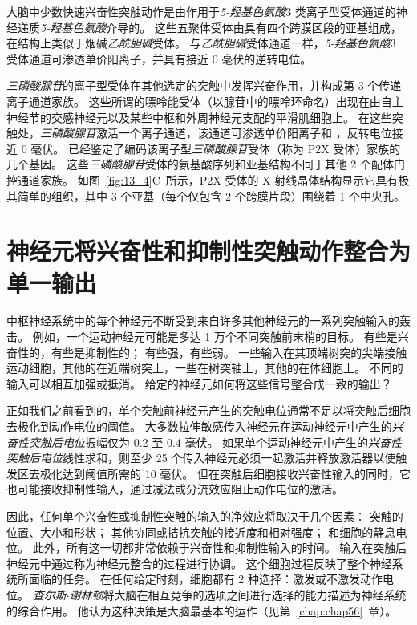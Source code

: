 大脑中少数快速兴奋性突触动作是由作用于\textit{5-羟基色氨酸}3 类离子型受体通道的神经递质\textit{5-羟基色氨酸}介导的。
这些五聚体受体由具有四个跨膜区段的亚基组成，在结构上类似于烟碱\textit{乙酰胆碱}受体。
与\textit{乙酰胆碱}受体通道一样，\textit{5-羟基色氨酸}3 受体通道可渗透单价阳离子，并具有接近 0 毫伏的逆转电位。


\textit{三磷酸腺苷}的离子型受体在其他选定的突触中发挥兴奋作用，并构成第 3 个传递离子通道家族。
这些所谓的嘌呤能受体（以腺苷中的嘌呤环命名）出现在由自主神经节的交感神经元以及某些中枢和外周神经元支配的平滑肌细胞上。
在这些突触处，\textit{三磷酸腺苷}激活一个离子通道，该通道可渗透单价阳离子和 ，反转电位接近 0 毫伏。
已经鉴定了编码该离子型\textit{三磷酸腺苷}受体（称为 P2X 受体）家族的几个基因。
这些\textit{三磷酸腺苷}受体的氨基酸序列和亚基结构不同于其他 2 个配体门控通道家族。
如图~\ref{fig:13_4}C~所示，P2X 受体的 X 射线晶体结构显示它具有极其简单的组织，其中 3 个亚基（每个仅包含 2 个跨膜片段）围绕着 1 个中央孔。



\section{神经元将兴奋性和抑制性突触动作整合为单一输出}

中枢神经系统中的每个神经元不断受到来自许多其他神经元的一系列突触输入的轰击。
例如，一个运动神经元可能是多达 1 万个不同突触前末梢的目标。
有些是兴奋性的，有些是抑制性的；
有些强，有些弱。
一些输入在其顶端树突的尖端接触运动细胞，其他的在近端树突上，一些在树突轴上，其他的在体细胞上。
不同的输入可以相互加强或抵消。
给定的神经元如何将这些信号整合成一致的输出？


正如我们之前看到的，单个突触前神经元产生的突触电位通常不足以将突触后细胞去极化到动作电位的阈值。
大多数拉伸敏感传入神经元在运动神经元中产生的\textit{兴奋性突触后电位}振幅仅为 0.2 至 0.4 毫伏。
如果单个运动神经元中产生的\textit{兴奋性突触后电位}线性求和，则至少 25 个传入神经元必须一起激活并释放激活器以使触发区去极化达到阈值所需的 10 毫伏。
但在突触后细胞接收兴奋性输入的同时，它也可能接收抑制性输入，通过减法或分流效应阻止动作电位的激活。


因此，任何单个兴奋性或抑制性突触的输入的净效应将取决于几个因素：
突触的位置、大小和形状；
其他协同或拮抗突触的接近度和相对强度；
和细胞的静息电位。 
此外，所有这一切都非常依赖于兴奋性和抑制性输入的时间。
输入在突触后神经元中通过称为神经元整合的过程进行协调。
这个细胞过程反映了整个神经系统所面临的任务。
在任何给定时刻，细胞都有 2 种选择：激发或不激发动作电位。
\textit{查尔斯$\cdot$谢林顿}将大脑在相互竞争的选项之间进行选择的能力描述为神经系统的综合作用。
他认为这种决策是大脑最基本的运作（见第~\ref{chap:chap56}~章）。



